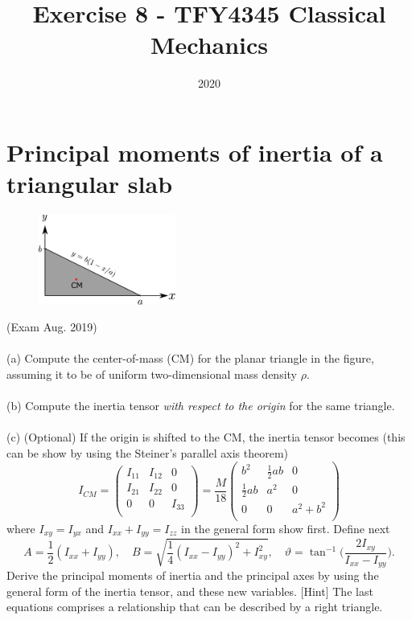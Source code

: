 \documentclass{article}
\title{Exercise 8 - TFY4345 Classical Mechanics}
\date{2020}
\begin{document}
    \maketitle
    \section{Principal moments of inertia of a triangular slab}
        \begin{figure}
            \includegraphics[width=0.4\textwidth]{figures/exercise_1_triangle.pdf}
        \end{figure}
        (Exam Aug. 2019) 
        \\ \\
        (a) Compute the center-of-mass (CM) for the planar triangle in the figure, assuming it to be of uniform two-dimensional mass density $\rho$.
        \\ \\
        (b) Compute the inertia tensor \emph{with respect to the origin} for the same triangle.
        \\ \\
        (c) (Optional) If the origin is shifted to the CM, the inertia tensor becomes (this can be show by using the Steiner's parallel axis theorem)
        \begin{equation*}
            I_{CM} = 
            \begin{pmatrix*}
                I_{11} & I_{12} & 0 \\
                I_{21} & I_{22} & 0 \\
                0 & 0 & I_{33} \\
            \end{pmatrix*}
             =\frac{M}{18} 
            \begin{pmatrix*}
                b^2 & \frac{1}{2}ab & 0 \\
                \frac{1}{2}ab & a^2 & 0 \\
                0 & 0 & a^2 + b^2 \\
            \end{pmatrix*}
        \end{equation*}
        where $I_{xy} = I_{yx}$ and $I_{xx} + I_{yy} = I_{zz}$ in the general form show first. Define next
        \begin{equation*}
            A = \frac{1}{2}(I_{xx} + I_{yy}), \quad B = \sqrt{\frac{1}{4}(I_{xx} - I_{yy})^2 + I_{xy}^2}, \quad \vartheta = \tan^{-1}\bigg( \frac{2I_{xy}}{I_{xx} - I_{yy}}\bigg).
        \end{equation*}
        Derive the principal moments of inertia and the principal axes by using the general form of the inertia tensor, and these new variables. [Hint] The last equations comprises a relationship that can be described by a right triangle.
\end{document}

